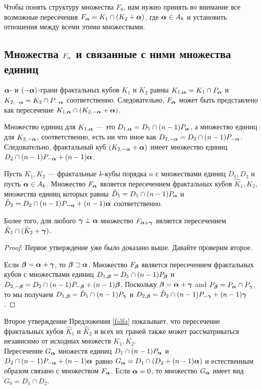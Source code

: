 Чтобы понять структуру множества $F_0$, нам нужно принять во внимание все возможные пересечения $F_{\bm{\alpha}}=K_1\cap (K_2+{\bm{\alpha}})$,
где ${\bm{\alpha}}\in A_k$ и установить отношения между всеми этими множествами.

\subsection{Множества $F_\alpha$ и связанные с ними множества единиц}

${\bm{\alpha}}$- и $(-{\bm{\alpha}})$-грани фрактальных кубов $K_1$ и $K_2$ равны $K_{1,{\bm{\alpha}}}=K_1\cap P_{\bm{\alpha}}$ и $K_{2,-{\bm{\alpha}}}=K_2\cap P_{-{\bm{\alpha}}}$ соответственно.
Следовательно, $F_{\bm{\alpha}}$ может быть представлено как пересечение $K_{1,{\bm{\alpha}}}\cap (K_{2,-{\bm{\alpha}}}+{\bm{\alpha}})$.

Множество единиц для $K_{1,{\bm{\alpha}}}$ --- это $D_{1,{\bm{\alpha}}}= D_1\cap(n-1)P_{\bm{\alpha}}$, а множество единиц для $K_{2,-{\bm{\alpha}}}$, соответственно, есть ни что иное как $D_{2,-{\bm{\alpha}}}= D_2\cap(n-1)P_{-{\bm{\alpha}}}$.
Следовательно, фрактальный куб $(K_{2,-{\bm{\alpha}}}+{\bm{\alpha}})$ имеет множество единиц $D_2\cap(n-1)P_{-{\bm{\alpha}}}+(n-1){\bm{\alpha}}$.
   
\begin{proposition}\label{falfa}
Пусть $K_1,K_2$ --- фрактальные $k$-кубы порядка $n$ с множествами единиц $D_1, D_2$ и пусть ${\bm{\alpha}}\in A_k$.
Множество $F_{\bm{\alpha}}$ является пересечением фрактальных кубов $\hat K_1,\hat K_2$, множества единиц которых равны $\hat D_1=D_1\cap(n-1)P_{\bm{\alpha}}$ и $\hat D_{2}=D_2\cap(n-1)P_{-{\bm{\alpha}}}+(n-1){\bm{\alpha}}$ соответственно.

Более того, для любого ${\bm{\gamma}}\perp{\bm{\alpha}}$ множество $F_{{\bm{\alpha}}+{\bm{\gamma}}}$ является пересечением $\hat K_{1}\cap(\hat K_{2}+{\bm{\gamma}})$.
\end{proposition}  

\begin{proof} 
Первое утверждение уже было доказано выше. Давайте проверим второе.

Если ${\bm{\beta}}={\bm{\alpha}}+{\bm{\gamma}} $, то ${\bm{\beta}}\sqsupset{\bm{\alpha}}$.
Множество $F_{\bm{\beta}}$ является пересечением фрактальных кубов с множествами единиц $D_{1,{\bm{\beta}}}=D_1\cap(n-1)P_{\bm{\beta}}$ и $D_{2,-{\bm{\beta}}}=D_2\cap(n-1)P_{-{\bm{\beta}}}+(n-1){\bm{\beta}}$.
Поскольку ${\bm{\beta}}={\bm{\alpha}}+{\bm{\gamma}}$ and $P_{\bm{\beta}}=P_{\bm{\alpha}}\cap P_{\bm{\gamma}}$, то мы получаем $D_{1,{\bm{\beta}}}=\hat D_{1}\cap(n-1)P_{\bm{\gamma}}$ и $D_{2,{\bm{\beta}}}=\hat D_{2}\cap(n-1)P_{-{\bm{\gamma}}}+(n-1){\bm{\gamma}}$.
\end{proof}


\begin{remark}\label{galfa}  
Второе утверждение Предложения \ref{falfa} показывает, что пересечение фрактальных кубов $\hat K_1$ и $\hat K_2$ и всех их граней также может рассматриваться независимо от исходных множеств $K_1, K_2$.\\
Пересечение $G_{\bm{\alpha}}$ множеств единиц $D_1\cap(n-1)P_{\bm{\alpha}}$ и $D_2\cap(n-1)P_{-{\bm{\alpha}}}+(n-1){\bm{\alpha}}$ равно $G_{\bm{\alpha}}=D_1\cap(D_2+(n-1){\bm{\alpha}})$ и естественным образом связано с множеством $F_{\bm{\alpha}}$.
Если ${\bm{\alpha}}=0$, то множество $G_{\bm{\alpha}}$ имеет вид $G_0=D_1\cap D_2$.
\end{remark}
 
